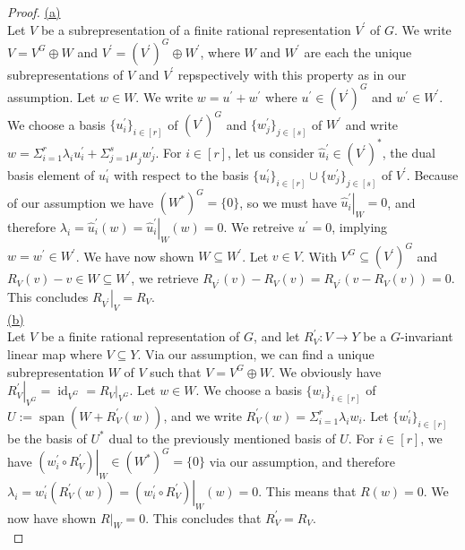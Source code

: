\begin{proof}
  \hfill \break
  \underline{(a)}\\
  Let $V$ be a subrepresentation of a finite rational representation $V^\prime$ of $G$.
  We write $V = V^G \oplus W$ and $V^\prime = (V^\prime)^G \oplus W^\prime$, where $W$ and $W^\prime$ are each the unique subrepresentations of $V$ and $V^\prime$ repspectively with this property as in our assumption.
  Let $w \in W$.
  We write $w = u^\prime + w^\prime$ where $u^\prime \in (V^\prime)^G$ and $w^\prime \in W^\prime$.
  We choose a basis $\{u^\prime_i\}_{i \in [r]}$ of $(V^\prime)^G$ and $\{w^\prime_j\}_{j \in [s]}$ of $W^\prime$ and write $w = \Sigma_{i=1}^r \lambda_i u^\prime_i + \Sigma_{j=1}^s \mu_j w^\prime_j$.
  For $i \in [r]$, let us consider $\hat{u}^\prime_i \in (V^\prime)^\ast$, the dual basis element of $u^\prime_i$ with respect to the basis $\{u^\prime_i\}_{i \in [r]} \cup \{w^\prime_j\}_{j \in [s]}$ of $V^\prime$.
  Because of our assumption we have $(W^\ast)^G = \{0\}$, so we must have $\left. \hat{u}^\prime_i \right|_W = 0$, and therefore $\lambda_i = \hat{u}^\prime_i (w) = \left. \hat{u}^\prime_i \right|_W (w) = 0$.
  We retreive $u^\prime = 0$, implying $ w  = w^\prime \in W^\prime $.
  We have now shown $W \subseteq W^\prime$.
  Let $v \in V$.
  With $V^G \subseteq (V^\prime)^G$ and $R_V (v) - v \in W \subseteq W^\prime$, we retrieve $R_{V^\prime}(v) - R_V (v) = R_{V^\prime}(v - R_V(v)) = 0$.
  This concludes $\left. R_{V^\prime} \right|_V = R_V$.  \\
  \underline{(b)}\\
  Let $V$ be a finite rational representation of $G$, and let $R^\prime_V \colon V \longrightarrow Y$ be a $G$-invariant linear map where $V \subseteq Y$.
  Via our assumption, we can find a unique subrepresentation $W$ of $V$ such that $V = V^G \oplus W$.
  We obviously have $\left. R^\prime_V \right|_{V^G} = \operatorname{id}_{V^G} = \left. R_V \right|_{V^G}$.
  Let $w \in W$.
  We choose a basis $\{w_i\}_{i \in [r]}$ of $U:= \operatorname{span}(W + R^\prime_V (w))$, and we write $R^\prime_V (w) = \Sigma_{i=1}^r \lambda_i w_i$.
  Let $\{w^\prime_i\}_{i \in [r]}$ be the basis of $U^\ast$ dual to the previously mentioned basis of $U$.
  For $i \in [r]$, we have $\left. (w^\prime_i \circ R^\prime_V) \right|_W \in (W^\ast)^G = \{0\}$ via our assumption, and therefore $ \lambda_i = w^\prime_i (R^\prime_V(w)) = \left. (w^\prime_i \circ R^\prime_V) \right|_W (w) = 0$.
  This means that $R(w) = 0$.
  We now have shown $\left. R \right|_{W} = 0$.
  This concludes that $R^\prime_V = R_V$.  \\

\end{proof}
